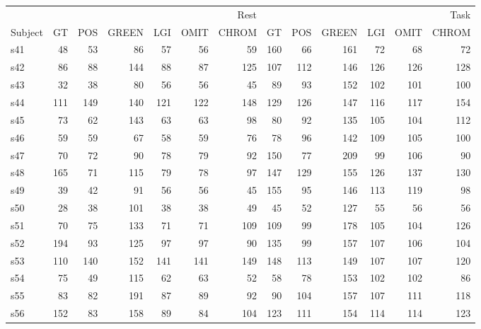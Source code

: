 \begin{tabular}{lrrrrrrrrrrrr}
\toprule
 & \multicolumn{6}{r}{Rest} & \multicolumn{6}{r}{Task} \\
Subject & GT & POS & GREEN & LGI & OMIT & CHROM & GT & POS & GREEN & LGI & OMIT & CHROM \\
\midrule
s41 & 48 & 53 & 86 & 57 & 56 & 59 & 160 & 66 & 161 & 72 & 68 & 72 \\
s42 & 86 & 88 & 144 & 88 & 87 & 125 & 107 & 112 & 146 & 126 & 126 & 128 \\
s43 & 32 & 38 & 80 & 56 & 56 & 45 & 89 & 93 & 152 & 102 & 101 & 100 \\
s44 & 111 & 149 & 140 & 121 & 122 & 148 & 129 & 126 & 147 & 116 & 117 & 154 \\
s45 & 73 & 62 & 143 & 63 & 63 & 98 & 80 & 92 & 135 & 105 & 104 & 112 \\
s46 & 59 & 59 & 67 & 58 & 59 & 76 & 78 & 96 & 142 & 109 & 105 & 100 \\
s47 & 70 & 72 & 90 & 78 & 79 & 92 & 150 & 77 & 209 & 99 & 106 & 90 \\
s48 & 165 & 71 & 115 & 79 & 78 & 97 & 147 & 129 & 155 & 126 & 137 & 130 \\
s49 & 39 & 42 & 91 & 56 & 56 & 45 & 155 & 95 & 146 & 113 & 119 & 98 \\
s50 & 28 & 38 & 101 & 38 & 38 & 49 & 45 & 52 & 127 & 55 & 56 & 56 \\
s51 & 70 & 75 & 133 & 71 & 71 & 109 & 109 & 99 & 178 & 105 & 104 & 126 \\
s52 & 194 & 93 & 125 & 97 & 97 & 90 & 135 & 99 & 157 & 107 & 106 & 104 \\
s53 & 110 & 140 & 152 & 141 & 141 & 149 & 148 & 113 & 149 & 107 & 107 & 120 \\
s54 & 75 & 49 & 115 & 62 & 63 & 52 & 58 & 78 & 153 & 102 & 102 & 86 \\
s55 & 83 & 82 & 191 & 87 & 89 & 92 & 90 & 104 & 157 & 107 & 111 & 118 \\
s56 & 152 & 83 & 158 & 89 & 84 & 104 & 123 & 111 & 154 & 114 & 114 & 123 \\
\bottomrule
\end{tabular}

